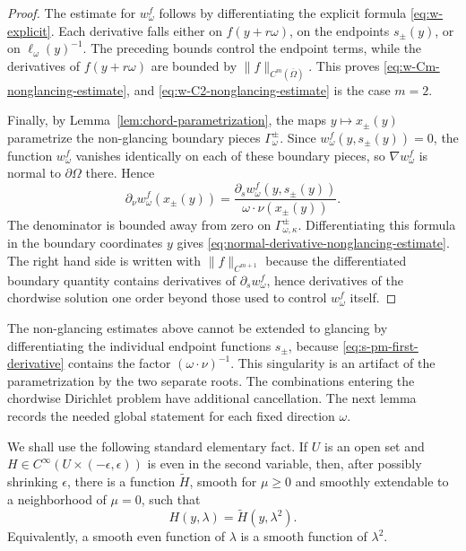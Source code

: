 \documentclass[11pt]{article}
\numberwithin{equation}{section}
\newcommand{\bd}{\partial}
\newcommand{\Om}{\Omega}
\begin{document}
\begin{proof}
The estimate for \(w_\omega^f\) follows by differentiating the explicit formula \eqref{eq:w-explicit}.  Each derivative falls either on \(f(y+r\omega)\), on the endpoints \(s_\pm(y)\), or on \(\ell_\omega(y)^{-1}\).  The preceding bounds control the endpoint terms, while the derivatives of \(f(y+r\omega)\) are bounded by \(\|f\|_{C^m(\overline\Om)}\).  This proves \eqref{eq:w-Cm-nonglancing-estimate}, and \eqref{eq:w-C2-nonglancing-estimate} is the case \(m=2\).

Finally, by Lemma~\ref{lem:chord-parametrization}, the maps \(y\mapsto x_\pm(y)\) parametrize the non-glancing boundary pieces \(\Gamma_\omega^\pm\).  Since \(w_\omega^f(y,s_\pm(y))=0\), the function \(w_\omega^f\) vanishes identically on each of these boundary pieces, so \(\nabla w_\omega^f\) is normal to \(\bd\Omega\) there.  Hence
\[
    \partial_\nu w_\omega^f(x_\pm(y))
    =
    \frac{\partial_s w_\omega^f(y,s_\pm(y))}
         {\omega\cdot\nu(x_\pm(y))} .
\]
The denominator is bounded away from zero on \(\Gamma_{\omega,\kappa}^\pm\).  Differentiating this formula in the boundary coordinates \(y\) gives \eqref{eq:normal-derivative-nonglancing-estimate}.  The right hand side is written with \(\|f\|_{C^{m+1}}\) because the differentiated boundary quantity contains derivatives of \(\partial_s w_\omega^f\), hence derivatives of the chordwise solution one order beyond those used to control \(w_\omega^f\) itself.
\end{proof}

The non-glancing estimates above cannot be extended to glancing by differentiating the individual endpoint functions \(s_\pm\), because \eqref{eq:s-pm-first-derivative} contains the factor \((\omega\cdot\nu)^{-1}\).  This singularity is an artifact of the parametrization by the two separate roots.  The combinations entering the chordwise Dirichlet problem have additional cancellation.  The next lemma records the needed global statement for each fixed direction \(\omega\).

We shall use the following standard elementary fact.  If \(U\) is an open set and
\(H\in C^\infty(U\times(-\epsilon,\epsilon))\) is even in the second variable, then, after possibly shrinking \(\epsilon\), there is a function
\(\widetilde H\), smooth for \(\mu\ge0\) and smoothly extendable to a neighborhood of \(\mu=0\), such that
\[
    H(y,\lambda)=\widetilde H(y,\lambda^2).
\]
Equivalently, a smooth even function of \(\lambda\) is a smooth function of \(\lambda^2\).  %
\end{document}
